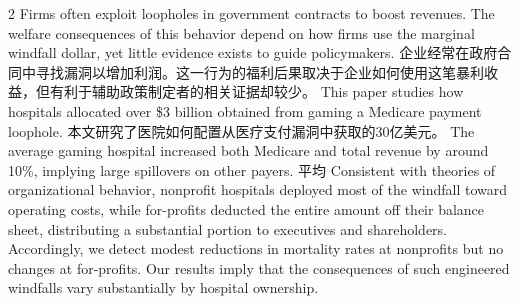 \documentclass[cn,hazy,blue,14pt,screen]{elegantnote}
\begin{document}
\begin{paracol}{2}
	Firms often exploit loopholes in government contracts to boost revenues. The welfare consequences of this behavior depend on how firms use the marginal windfall dollar, yet little evidence exists to guide policymakers. 
	\switchcolumn
	企业经常在政府合同中寻找漏洞以增加利润。这一行为的福利后果取决于企业如何使用这笔暴利收益，但有利于辅助政策制定者的相关证据却较少。
	\switchcolumn*
	This paper studies how hospitals allocated over \$3 billion obtained from gaming a Medicare payment loophole. 
	\switchcolumn
	本文研究了医院如何配置从医疗支付漏洞中获取的30亿美元。
	\switchcolumn*
	The average gaming hospital increased both Medicare and total revenue by around 10\%, implying large spillovers on other payers.
	\switchcolumn
	平均
	\switchcolumn*
	 Consistent with theories of organizational behavior, nonprofit hospitals deployed most of the windfall toward operating costs, while for-profits deducted the entire amount off their balance sheet, distributing a substantial portion to executives and shareholders. Accordingly, we detect modest reductions in mortality rates at nonprofits but no changes at for-profits. Our results imply that the consequences of such engineered windfalls vary substantially by hospital ownership.
	
	
\end{paracol}
\end{document}
